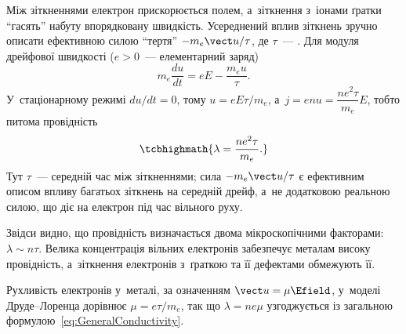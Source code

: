 Між зіткненнями електрон прискорюється полем, а~зіткнення з~іонами ґратки \enquote{гасять}
набуту впорядковану швидкість. Усереднений вплив зіткнень зручно описати ефективною силою
\enquote{тертя} $-m_e\vect u/\tau$, де $\tau$~--- .
Для модуля дрейфової швидкості ($e>0$~--- елементарний заряд)
\begin{equation*}
	m_e\frac{du}{dt}=eE-\frac{m_eu}{\tau}.
\end{equation*}
У~стаціонарному режимі $du/dt=0$, тому $u=eE\tau/m_e$, а~$j=enu=\dfrac{ne^2\tau}{m_e}E$,
тобто питома провідність
\begin{equation}\label{eq:DrudeLorentzConductivity}
	\tcbhighmath{
		\lambda = \frac{ne^2\tau}{m_e}.
	}
\end{equation}
Тут $\tau$~--- середній час між зіткненнями; сила $-m_e\vect u/\tau$ є ефективним
описом впливу багатьох зіткнень на середній дрейф, а~не додатковою реальною силою, що діє
на електрон під час вільного руху.



Звідси видно, що провідність визначається двома мікроскопічними факторами: $\lambda\sim
n\tau$. Велика концентрація вільних електронів забезпечує металам високу провідність,
а~зіткнення електронів з~ґраткою та її дефектами обмежують її.

Рухливість електронів у~металі, за означенням $\vect u=\mu\Efield$, у~моделі Друде--Лоренца
дорівнює $\mu=e\tau/m_e$, так що $\lambda=ne\mu$ узгоджується із загальною
формулою~\eqref{eq:GeneralConductivity}.

